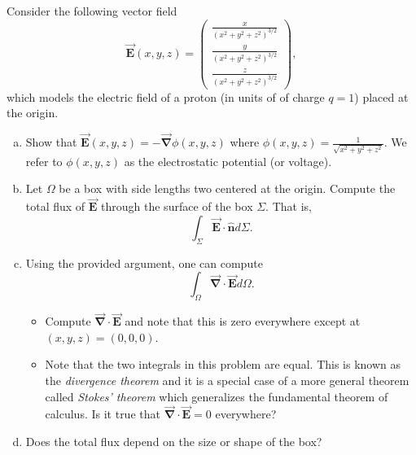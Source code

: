 \documentclass[12pt]{article} %
\newcommand{\grad}{\boldsymbol{\vec{\nabla}}}
\newcommand{\vecfieldE}{\boldsymbol{\vec{E}}}
\newcommand{\unitvec}{\boldsymbol{\hat{n}}}
\begin{document}
\newpage
\begin{problem}
Consider the following vector field
\[
\vecfieldE(x,y,z) = \begin{pmatrix} \frac{x}{(x^2+y^2+z^2)^{3/2}} \\ \frac{y}{(x^2+y^2+z^2)^{3/2}} \\ \frac{z}{(x^2+y^2+z^2)^{3/2}} \end{pmatrix},
\]
which models the electric field of a proton (in units of of charge $q=1$) placed at the origin.
\begin{enumerate}[(a)]
	\item Show that $\vecfieldE(x,y,z) = - \grad \phi(x,y,z)$ where $\phi(x,y,z) = \frac{1}{\sqrt{x^2+y^2+z^2}}$.  We refer to $\phi(x,y,z)$ as the electrostatic potential (or voltage).
	\item Let $\Omega$ be a box with side lengths two centered at the origin.  Compute the total flux of $\vecfieldE$ through the surface of the box $\Sigma$. That is,
	\[
	\int_\Sigma \vecfieldE \cdot \unitvec d\Sigma.
	\]
	\item Using the provided argument, one can compute
	\[
	\int_\Omega \grad \cdot \vecfieldE d\Omega.
	\]
	\begin{itemize}
		\item Compute $\grad \cdot \vecfieldE$ and note that this is zero everywhere except at $(x,y,z)=(0,0,0)$.
		\item Note that the two integrals in this problem are equal. This is known as the \emph{divergence theorem} and it is a special case of a more general theorem called \emph{Stokes' theorem} which generalizes the fundamental theorem of calculus. Is it true that $\grad \cdot \vecfieldE = 0$ everywhere?
	\end{itemize}
	\item Does the total flux depend on the size or shape of the box?
\end{enumerate}
\end{problem}~
\end{document}
